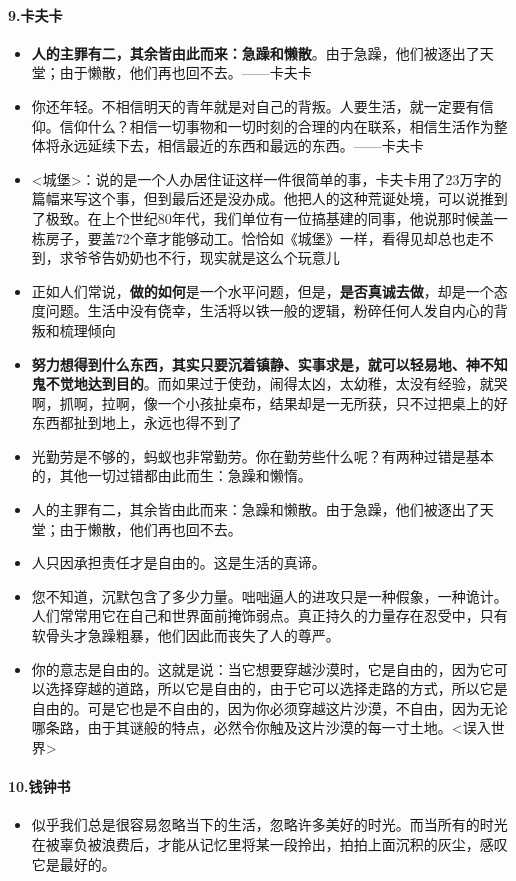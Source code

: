 \documentclass[UTF8,a4paper,8pt]{ctexart}
\begin{document}
 \paragraph{9.卡夫卡}
 \begin{itemize}
 	\item \textbf{人的主罪有二，其余皆由此而来：急躁和懒散}。由于急躁，他们被逐出了天堂；由于懒散，他们再也回不去。——卡夫卡
 	
 	\item 你还年轻。不相信明天的青年就是对自己的背叛。人要生活，就一定要有信仰。信仰什么？相信一切事物和一切时刻的合理的内在联系，相信生活作为整体将永远延续下去，相信最近的东西和最远的东西。——卡夫卡
 	\item  <城堡>：说的是一个人办居住证这样一件很简单的事，卡夫卡用了23万字的篇幅来写这个事，但到最后还是没办成。他把人的这种荒诞处境，可以说推到了极致。在上个世纪80年代，我们单位有一位搞基建的同事，他说那时候盖一栋房子，要盖72个章才能够动工。恰恰如《城堡》一样，看得见却总也走不到，求爷爷告奶奶也不行，现实就是这么个玩意儿
 	\item  正如人们常说，\textbf{做的如何}是一个水平问题，但是，\textbf{是否真诚去做}，却是一个态度问题。生活中没有侥幸，生活将以铁一般的逻辑，粉碎任何人发自内心的背叛和梳理倾向
 	\item  \textbf{努力想得到什么东西，其实只要沉着镇静、实事求是，就可以轻易地、神不知鬼不觉地达到目的}。而如果过于使劲，闹得太凶，太幼稚，太没有经验，就哭啊，抓啊，拉啊，像一个小孩扯桌布，结果却是一无所获，只不过把桌上的好东西都扯到地上，永远也得不到了
 	\item  光勤劳是不够的，蚂蚁也非常勤劳。你在勤劳些什么呢？有两种过错是基本的，其他一切过错都由此而生：急躁和懒惰。
 	\item  人的主罪有二，其余皆由此而来：急躁和懒散。由于急躁，他们被逐出了天堂；由于懒散，他们再也回不去。
 	\item  人只因承担责任才是自由的。这是生活的真谛。
 	\item  您不知道，沉默包含了多少力量。咄咄逼人的进攻只是一种假象，一种诡计。人们常常用它在自己和世界面前掩饰弱点。真正持久的力量存在忍受中，只有软骨头才急躁粗暴，他们因此而丧失了人的尊严。
 	\item  你的意志是自由的。这就是说：当它想要穿越沙漠时，它是自由的，因为它可以选择穿越的道路，所以它是自由的，由于它可以选择走路的方式，所以它是自由的。可是它也是不自由的，因为你必须穿越这片沙漠，不自由，因为无论哪条路，由于其谜般的特点，必然令你触及这片沙漠的每一寸土地。<误入世界>
 \end{itemize}	
 
 \paragraph{10.钱钟书}
 \begin{itemize}
 	\item 似乎我们总是很容易忽略当下的生活，忽略许多美好的时光。而当所有的时光在被辜负被浪费后，才能从记忆里将某一段拎出，拍拍上面沉积的灰尘，感叹它是最好的。
 \end{itemize}
 
\end{document}
